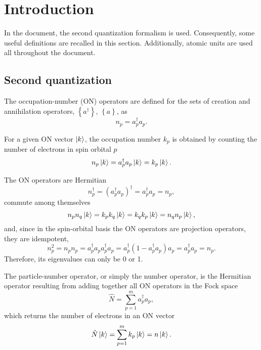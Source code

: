 \graphicspath{{./figures/}}

\section{Introduction}
In the document, the second quantization formalism is used. 
Consequently, some useful definitions are recalled
in this section.
Additionally, atomic units are used all throughout the document.

\subsection{Second quantization} %
\label{sec:Second quantization}

The occupation-number (ON) operators are defined for the sets
of creation and annihilation operators, $\left\{ a^{\dagger} \right\}$, 
$\left\{ a \right\}$, as
\begin{equation}
    n_p = a_p^{\dagger} a_p
    .
\end{equation}

For a given ON vector $\Ket{k}$, the occupation number $k_p$ is obtained by
counting the number of electrons in spin orbital $p$
\begin{equation}
    n_p \Ket{k} =
    a_p^{\dagger} a_p \Ket{k} =
    k_p \Ket{k}
    .
\end{equation}

The ON operators are Hermitian 
\begin{equation}
    n_p^{\dagger} =
    \left( a_p^{\dagger} a_p \right)^{\dagger} =
    a_p^{\dagger} a_p =
    n_p
    ,
\end{equation}
commute among themselves 
\begin{equation}
    n_p n_q \Ket{k} =
    k_p k_q \Ket{k} =
    k_q k_p \Ket{k} =
    n_q n_p \Ket{k}
    ,
\end{equation}
and,
since in the spin-orbital basis the ON operators are projection operators,
they are idempotent, 
\begin{equation}
    n_p^2 =
    n_p n_p =
    a_p^{\dagger} a_p a_p^{\dagger} a_p =
    a_p^{\dagger} \left( 1 - a_p^{\dagger} a_p \right) a_p =
    a_p^{\dagger} a_p =
    n_p
    .
\end{equation}
Therefore, its eigenvalues can only be 0 or 1.

The particle-number operator, or simply the number operator, is the Hermitian
operator resulting from adding together all ON operators in the Fock space 
\begin{equation}
    \hat{N} =
    \sum_{p=1}^{m} a_p^{\dagger} a_p
    ,
\end{equation}
which returns the number of electrons in an ON vector 
\begin{equation}
    \hat{N} \Ket{k} =
    \sum_{p=1}^{m} k_p \Ket{k} =
    n \Ket{k}
    .
\end{equation}

